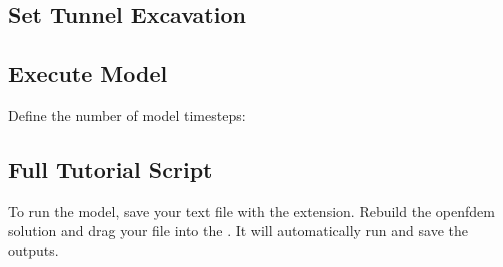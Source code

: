 \documentclass[letterpaper,10pt,english]{sphinxmanual}
\begin{document}
\subsection{Set Tunnel Excavation}
\label{\detokenize{rst_tutorials/tutorial2_insitu:set-tunnel-excavation}}
\begin{sphinxVerbatim}[commandchars=\\\{\}]
 
    
    
    
    
\end{sphinxVerbatim}


\subsection{Execute Model}
\label{\detokenize{rst_tutorials/tutorial2_insitu:execute-model}}
Define the number of model time\sphinxhyphen{}steps:

\begin{sphinxVerbatim}[commandchars=\\\{\}]
 
\end{sphinxVerbatim}


\subsection{Full Tutorial Script}
\label{\detokenize{rst_tutorials/tutorial2_insitu:full-tutorial-script}}
To run the model, save your text file with the  extension. Rebuild the openfdem solution and drag your
 file into the . It will automatically run and save the outputs.
\end{document}

